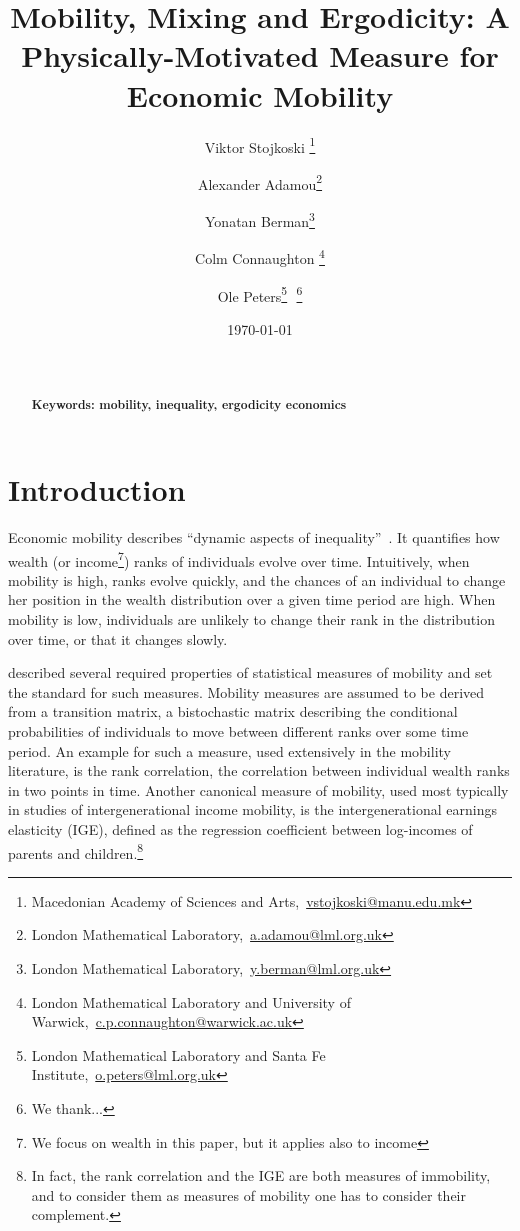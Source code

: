 \documentclass[11pt]{article}
\newcommand{\bc}{\begin{center}}
\newcommand{\ec}{\end{center}}
\newcommand{\red}[1]{{\color{red} #1}}
\numberwithin{equation}{section}
\begin{document}
\begin{titlepage}
\title{Mobility, Mixing and Ergodicity: A Physically-Motivated Measure for Economic Mobility}
\author{Viktor Stojkoski \footnote{Macedonian Academy of Sciences and Arts,~\url{vstojkoski@manu.edu.mk}} \and Alexander Adamou\footnote{London Mathematical Laboratory,~\url{a.adamou@lml.org.uk}} \and Yonatan Berman\footnote{London Mathematical Laboratory,~\url{y.berman@lml.org.uk}} \and Colm Connaughton \footnote{London Mathematical Laboratory and University of Warwick,~\url{c.p.connaughton@warwick.ac.uk}} \and Ole Peters\footnote{London Mathematical Laboratory and Santa Fe Institute,~\url{o.peters@lml.org.uk}}\,\, \thanks{We thank...}}
\date{\today}
\maketitle
\begin{abstract}
\noindent 
\\
\\
\noindent\textbf{Keywords: mobility, inequality, ergodicity economics}
\end{abstract}
\setcounter{page}{0}
\thispagestyle{empty}
\end{titlepage}
\pagebreak \newpage
\section{Introduction}\label{sec:introduction}
Economic mobility describes ``dynamic aspects of inequality''~\citep{Shorrocks1978}. It quantifies how wealth (or income\footnote{We focus on wealth in this paper, but it applies also to income}) ranks of individuals evolve over time. Intuitively, when mobility is high, ranks evolve quickly, and the chances of an individual to change her position in the wealth distribution over a given time period are high. When mobility is low, individuals are unlikely to change their rank in the distribution over time, or that it changes slowly.

\citet{Shorrocks1978} described several required properties of statistical measures of mobility and set the standard for such measures. Mobility measures are assumed to be derived from a transition matrix, a bistochastic matrix describing the conditional probabilities of individuals to move between different ranks over some time period. An example for such a measure, used extensively in the mobility literature, is the rank correlation, the correlation between individual wealth ranks in two points in time. Another canonical measure of mobility, used most typically in studies of intergenerational income mobility, is the intergenerational earnings elasticity (IGE), defined as the regression coefficient between log-incomes of parents and children.\footnote{In fact, the rank correlation and the IGE are both measures of immobility, and to consider them as measures of mobility one has to consider their complement.}
\end{document}
